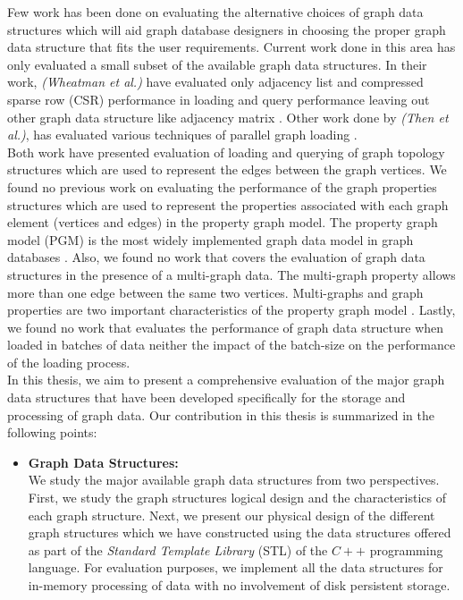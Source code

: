 {Few work has been done on evaluating the alternative choices of graph data structures which will aid graph database designers in choosing the proper graph data structure that fits the user requirements. Current work done in this area has only evaluated a small subset of the available graph data structures. In their work, \textit{(Wheatman et al.)} have evaluated only adjacency list and compressed sparse row (CSR) performance in loading and query performance leaving out other graph data structure like adjacency matrix \cite{wheatmanpacked}. Other work done by \textit{(Then et al.)}, has evaluated various techniques of parallel graph loading \cite{then2016evaluation}. \\

Both work \cite{wheatmanpacked, then2016evaluation} have presented evaluation of loading and querying of graph topology structures which are used to represent the edges between the graph vertices. We found no previous work on evaluating the performance of the graph properties structures which are used to represent the properties associated with each graph element (vertices and edges) in the property graph model. The property graph model (PGM) is the most widely implemented graph data model in graph databases . Also, we found no work that covers the evaluation of graph data structures in the presence of a multi-graph data. The multi-graph property allows more than one edge between the same two vertices. Multi-graphs and graph properties are two important characteristics of the property graph model \cite{robinson2013graph}. Lastly, we found no work that evaluates the performance of graph data structure when loaded in batches of data neither the impact of the batch-size on the performance of the loading process.\\




In this thesis, we aim to present a comprehensive evaluation of the major graph data structures that have been developed specifically for the storage and processing of graph data. Our contribution in this thesis is summarized in the following points:


\begin{itemize}  
\item\textbf{Graph Data Structures:}\\
We study the major available graph data structures from two perspectives. First, we study the graph structures logical design and the characteristics of each graph structure. Next, we present our physical design of the different graph structures which we have constructed using the data structures offered as part of the \textit{Standard Template Library} (STL) of the $C++$ programming language. For evaluation purposes, we implement all the data structures for in-memory processing of data with no involvement of disk persistent storage.\\


\end{itemize}}

